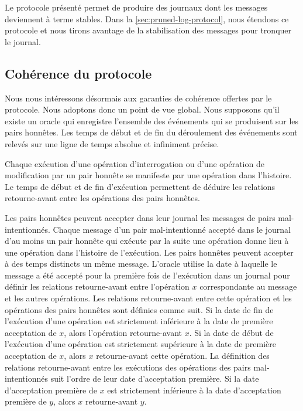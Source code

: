 Le protocole présenté permet de produire des journaux dont les messages deviennent à terme stables.
Dans la \autoref{sec:pruned-log-protocol}, nous étendons ce protocole et nous tirons avantage de la stabilisation des messages pour tronquer le journal.


\subsection{Cohérence du protocole}

Nous nous intéressons désormais aux garanties de cohérence offertes par le protocole.
Nous adoptons donc un point de vue global.
Nous supposons qu'il existe un oracle qui enregistre l'ensemble des événements qui se produisent sur les pairs honnêtes.
Les temps de début et de fin du déroulement des événements sont relevés sur une ligne de temps absolue et infiniment précise.

Chaque exécution d'une opération d'interrogation ou d'une opération de modification par un pair honnête se manifeste par une opération dans l'histoire.
Le temps de début et de fin d'exécution permettent de déduire les relations retourne-avant entre les opérations des pairs honnêtes.

Les pairs honnêtes peuvent accepter dans leur journal les messages de pairs mal-intentionnés.
Chaque message d'un pair mal-intentionné accepté dans le journal d'au moins un pair honnête qui exécute par la suite une opération donne lieu à une opération dans l'histoire de l'exécution.
Les pairs honnêtes peuvent accepter à des temps distincts un même message.
L'oracle utilise la date à laquelle le message a été accepté pour la première fois de l'exécution dans un journal pour définir les relations retourne-avant entre l'opération $x$ correspondante au message et les autres opérations.
Les relations retourne-avant entre cette opération et les opérations des pairs honnêtes sont définies comme suit.
Si la date de fin de l'exécution d'une opération est strictement inférieure à la date de première acceptation de $x$, alors l'opération retourne-avant $x$.
Si la date de début de l'exécution d'une opération est strictement supérieure à la date de première acceptation de $x$, alors $x$ retourne-avant cette opération.
La définition des relations retourne-avant entre les exécutions des opérations des pairs mal-intentionnés suit l'ordre de leur date d'acceptation première.
Si la date d'acceptation première de $x$ est strictement inférieure à la date d'acceptation première de $y$, alors $x$ retourne-avant $y$.

